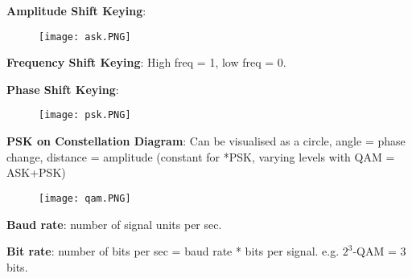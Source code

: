 \documentclass[a4paper,landscape]{article}
\newcommand{\rnname}[1]{\textbf{#1}}
\begin{document}
\begin{multicols*}{4}
\begin{flatitemize}
\item \rnname{Amplitude Shift Keying}: 
\vspace{-0.3cm}
    \begin{figure}[H]
      \texttt{[image: ask.PNG]}
    \end{figure}
\vspace{-0.4cm}
\item \rnname{Frequency Shift Keying}: High freq = 1, low freq = 0.
\item \rnname{Phase Shift Keying}: 
\vspace{-0.3cm}
    \begin{figure}[H]
      \texttt{[image: psk.PNG]}
    \end{figure}
\vspace{-0.4cm}
\item \rnname{PSK on Constellation Diagram}: Can be visualised as a circle, angle = phase change, distance = amplitude (constant for *PSK, varying levels with QAM = ASK+PSK)
\vspace{-0.3cm}
    \begin{figure}[H]
      \texttt{[image: qam.PNG]}
    \end{figure}
\vspace{-0.4cm}
\item \rnname{Baud rate}: number of signal units per sec.
\item \rnname{Bit rate}: number of bits per sec = baud rate * bits per signal. e.g. $2^3$-QAM = 3 bits.
\end{flatitemize}

\end{multicols*}
\end{document}
